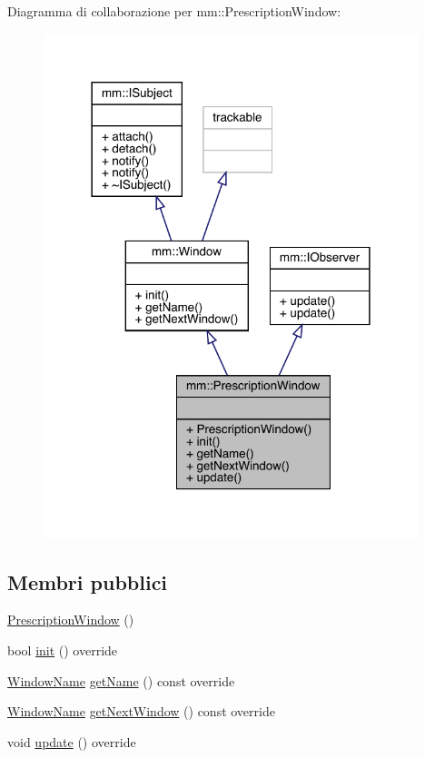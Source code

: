 Diagramma di collaborazione per mm\+:\+:Prescription\+Window\+:
\nopagebreak
\begin{figure}[H]
\begin{center}
\leavevmode
\includegraphics[width=309pt]{d5/d0d/classmm_1_1_prescription_window__coll__graph}
\end{center}
\end{figure}
\subsection*{Membri pubblici}
\begin{DoxyCompactItemize}
\item 
\mbox{\hyperlink{classmm_1_1_prescription_window_ad40a15a976a851f81fad2c7ec9116555}{Prescription\+Window}} ()
\item 
bool \mbox{\hyperlink{classmm_1_1_prescription_window_a4764fe59cd6aeaa46c7fd8820dd4102b}{init}} () override
\item 
\mbox{\hyperlink{namespacemm_a4e9d92e04f65dbf2fc1963947da0d93c}{Window\+Name}} \mbox{\hyperlink{classmm_1_1_prescription_window_a0770b1cfa7eef3bfa990d7ddeeb03a39}{get\+Name}} () const override
\item 
\mbox{\hyperlink{namespacemm_a4e9d92e04f65dbf2fc1963947da0d93c}{Window\+Name}} \mbox{\hyperlink{classmm_1_1_prescription_window_aec9558aea3a0fb15e3148ebf4c9e8d40}{get\+Next\+Window}} () const override
\item 
void \mbox{\hyperlink{classmm_1_1_prescription_window_a51195815f64b79179e3dafbb89b785e8}{update}} () override
\end{DoxyCompactItemize}


